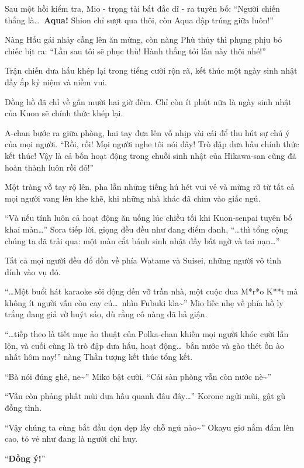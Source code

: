 \documentclass[../main.tex]{subfiles}
\begin{document}
Sau một hồi kiểm tra, Mio - trọng tài bất đắc dĩ - ra tuyên bố: ``Người chiến thắng là\dots\ \textbf{Aqua!} Shion chỉ sượt qua thôi, còn Aqua đập trúng giữa luôn!''

Nàng Hấu gái nhảy cẫng lên ăn mừng, còn nàng Phù thủy thì phụng phịu bỏ chiếc bịt ra: ``Lần sau tôi sẽ phục thù! Hành thắng tỏi lần này thôi nhé!''

Trận chiến dưa hấu khép lại trong tiếng cười rộn rã, kết thúc một ngày sinh nhật đầy ắp kỷ niệm và niềm vui.

\ct

Đồng hồ đã chỉ về gần mười hai giờ đêm. Chỉ còn ít phút nữa là ngày sinh nhật của Kuon sẽ chính thức khép lại.

A-chan bước ra giữa phòng, hai tay đưa lên vỗ nhịp vài cái để thu hút sự chú ý của mọi người. ``Rồi, rồi! Mọi người nghe tôi nói đây! Trò đập dưa hấu chính thức kết thúc! Vậy là cả bốn hoạt động trong chuỗi sinh nhật của Hikawa-san cũng đã hoàn thành luôn rồi đó!''

Một tràng vỗ tay rộ lên, pha lẫn những tiếng hú hét vui vẻ và mừng rỡ từ tất cả mọi người vang lên khe khẽ, khi những nhà khác đã chìm vào giấc ngủ.

``Và nếu tính luôn cả hoạt động ăn uống lúc chiều tối khi Kuon-senpai tuyên bố khai màn\dots'' Sora tiếp lời, giọng đều đều như đang điểm danh, ``\dots thì tổng cộng chúng ta đã trải qua: một màn cắt bánh sinh nhật đầy bất ngờ và tai nạn\dots''

Tất cả mọi người đều đổ dồn về phía Watame và Suisei, những người vô tình dính vào vụ đó.

``\dots Một buổi hát karaoke sôi động đến vỡ trần nhà, một cuộc đua M*r*o K**t mà không ít người vẫn còn cay cú\dots\ nhìn Fubuki kìa\~{}'' Mio liếc nhẹ về phía hồ ly trắng đang giả vờ huýt sáo, dù rằng cô nàng đã hả giận.

``\dots tiếp theo là tiết mục ảo thuật của Polka-chan khiến mọi người khóc cười lẫn lộn, và cuối cùng là trò đập dưa hấu, hoạt động\dots\ bắn nước và gào thét ồn ào nhất hôm nay!'' nàng Thần tượng kết thúc tổng kết.

``Bà nói đúng ghê, ne\~{}'' Miko bật cười. ``Cái sàn phòng vẫn còn nước nè\~{}''

``Vẫn còn phảng phất mùi dưa hấu quanh đâu đây\dots'' Korone ngửi mũi, gật gù đồng tình.

``Vậy chúng ta cùng bắt đầu dọn dẹp lấy chỗ ngủ nào\~{}'' Okayu giơ nắm đấm lên cao, tỏ vẻ như đang là người chỉ huy.

``\textbf{Đồng ý!}''
\end{document}
